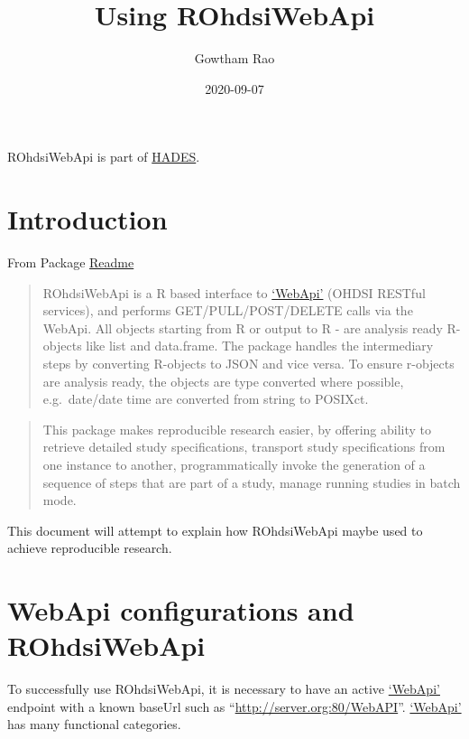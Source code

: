 \documentclass[
]{article}
\title{Using ROhdsiWebApi}
\author{Gowtham Rao}
\date{2020-09-07}
\begin{document}
\maketitle

{
\setcounter{tocdepth}{2}
\tableofcontents
}
ROhdsiWebApi is part of \href{https://ohdsi.github.io/Hades}{HADES}.

\hypertarget{introduction}{%
\section{Introduction}\label{introduction}}

From Package
\href{https://github.com/OHDSI/ROhdsiWebApi/blob/master/README.md}{Readme}

\begin{quote}
ROhdsiWebApi is a R based interface to
\href{https://github.com/ohdsi/webapi}{`WebApi'} (OHDSI RESTful
services), and performs GET/PULL/POST/DELETE calls via the WebApi. All
objects starting from R or output to R - are analysis ready R-objects
like list and data.frame. The package handles the intermediary steps by
converting R-objects to JSON and vice versa. To ensure r-objects are
analysis ready, the objects are type converted where possible,
e.g.~date/date time are converted from string to POSIXct.
\end{quote}

\begin{quote}
This package makes reproducible research easier, by offering ability to
retrieve detailed study specifications, transport study specifications
from one instance to another, programmatically invoke the generation of
a sequence of steps that are part of a study, manage running studies in
batch mode.
\end{quote}

This document will attempt to explain how ROhdsiWebApi maybe used to
achieve reproducible research.

\hypertarget{webapi-configurations-and-rohdsiwebapi}{%
\section{WebApi configurations and
ROhdsiWebApi}\label{webapi-configurations-and-rohdsiwebapi}}

To successfully use ROhdsiWebApi, it is necessary to have an active
\href{https://github.com/ohdsi/webapi}{`WebApi'} endpoint with a known
baseUrl such as ``\url{http://server.org:80/WebAPI}''.
\href{https://github.com/ohdsi/webapi}{`WebApi'} has many functional
categories.
\end{document}
